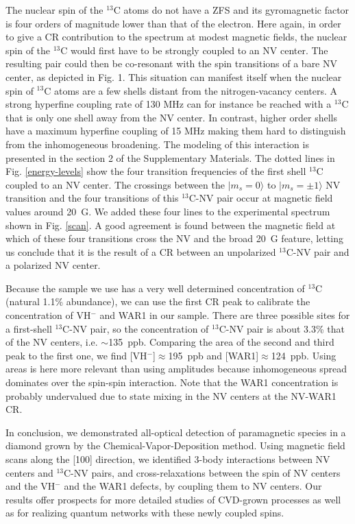 \documentclass[9pt,twocolumn,twoside]{revtex4-1}
\begin{document}
The nuclear spin of the $^{13}$C atoms do not have a ZFS and its gyromagnetic factor is four orders of magnitude lower than that of the electron. Here again, in order to give a CR contribution to the spectrum at modest magnetic fields, the nuclear spin of the $^{13}$C would first have to be strongly coupled to an NV center. The resulting pair could then be co-resonant with the spin transitions of a bare NV center, as depicted in Fig. 1. This situation can manifest itself when the nuclear spin of $^{13}$C atoms are a few shells distant from the nitrogen-vacancy centers. A strong hyperfine coupling rate of 130 MHz can for instance be reached with a $^{13}$C that is only one shell away from the NV center.  
In contrast, higher order shells have a maximum hyperfine coupling of 15 MHz \cite{smeltzer201113c} making them hard to distinguish from the inhomogeneous broadening.
The modeling of this interaction is presented in the section 2 of the Supplementary Materials. The dotted lines in Fig. \ref{energy-levels} show the four transition frequencies of the first shell $^{13}$C coupled to an NV center. The crossings between the $|m_s=0\rangle$ to $|m_s=\pm 1\rangle$ NV transition and the four transitions of this  $^{13}$C-NV pair occur at magnetic field values around 20~G. 
We added these four lines to the experimental spectrum shown in Fig. \ref{scan}. A good agreement is found between the magnetic field at which of these four transitions cross the NV and the broad 20~G feature, letting us conclude that it is the result of a CR between an unpolarized $^{13}$C-NV pair and a polarized NV center.

Because the sample we use has a very well determined concentration of $^{13}$C (natural 1.1\% abundance), we can use the first CR peak to calibrate the concentration of VH$^-$ and WAR1 in our sample. There are three possible sites for a first-shell $^{13}$C-NV pair, so the concentration of $^{13}$C-NV pair is about 3.3\% that of the NV centers, i.e. $\sim$135~ppb. Comparing the area of the second and third peak to the first one, we find [VH$^-$]$\approx$195~ppb and [WAR1]$\approx$124~ppb. Using areas is here more relevant than using amplitudes because inhomogeneous spread dominates over the spin-spin interaction. Note that the  WAR1 concentration is probably undervalued due to state mixing in the NV centers at the NV-WAR1 CR.

In conclusion, we demonstrated all-optical detection of paramagnetic species in a diamond grown by the Chemical-Vapor-Deposition method. 
Using magnetic field scans along the [100] direction, we identified 3-body interactions between NV centers and $^{13}$C-NV pairs, and cross-relaxations between the spin of NV centers and the VH$^-$ and the WAR1 defects, by coupling them to NV centers. Our results offer prospects for more detailed studies of CVD-grown processes as well as for realizing quantum networks with these newly coupled spins.
\end{document}
